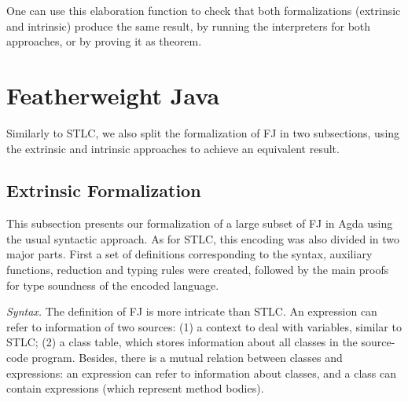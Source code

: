 \documentclass[tese,capa,english]{texufpel}
\def\resethooks{%
  \global\let\SaveRestoreHook\empty
  \global\let\ColumnHook\empty}
\let\hspre\empty
\let\hspost\empty
\newcommand{\D}[1]{\blue{\mathsf{#1}}}
\newcommand{\Con}[1]{\green{\mathsf{#1}}}
\newcommand{\F}[1]{\blue{\mathsf{#1}}}
\newcommand{\V}[1]{\black{\mathsf{#1}}}
\newcommand{\HC}[1]{\green{\mathsf{#1}}}
\begin{document}
\resethooks

One can use this elaboration function to check that both formalizations (extrinsic and intrinsic) produce the same result, by running the interpreters for both approaches, or by proving it as theorem.

\section{Featherweight Java}

Similarly to STLC, we also split the formalization of FJ in two subsections, using the extrinsic and intrinsic approaches to achieve an equivalent result. 

\subsection{Extrinsic Formalization}

This subsection presents our formalization of a large subset of FJ in Agda using the usual syntactic approach. As for STLC, this encoding was also divided in two major parts. First a set of definitions corresponding to the syntax, auxiliary functions, reduction and typing rules were created, followed by the main proofs for type soundness of the encoded language.

\vspace{8pt}
\noindent\emph{Syntax.} The definition of FJ is more intricate than STLC. An expression can refer to information of two sources: (1) a context to deal with variables, similar to STLC; (2) a class table, which stores information about all classes in the source-code program. Besides, there is a mutual relation between classes and expressions: an expression can refer to information about classes, and a class can contain expressions (which represent method bodies).
\end{document}
